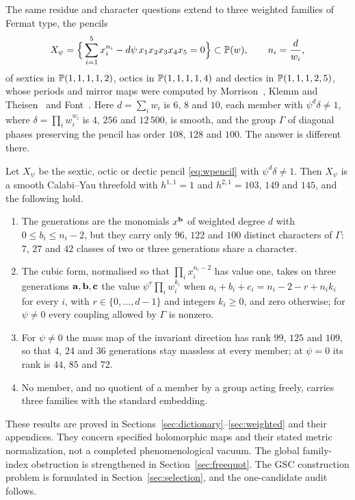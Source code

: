 The same residue and character questions extend to three weighted families
of Fermat type, the pencils
\begin{equation}\label{eq:wpencil}
X_\psi=\Big\{\sum_{i=1}^5x_i^{n_i}-d\psi\,x_1x_2x_3x_4x_5=0\Big\}
\subset\mathbb{P}(w),\qquad n_i=\frac{d}{w_i},
\end{equation}
of sextics in $\mathbb{P}(1,1,1,1,2)$, octics in $\mathbb{P}(1,1,1,1,4)$ and dectics in
$\mathbb{P}(1,1,1,2,5)$, whose periods and mirror maps were computed by
Morrison~\cite{Mor92}, Klemm and Theisen~\cite{KT93} and
Font~\cite{Fon93}. Here $d=\sum_iw_i$ is $6$, $8$ and $10$, each member
with $\psi^d\delta\ne1$, where $\delta=\prod_iw_i^{w_i}$ is $4$, $256$ and
$12\,500$, is smooth, and the group $\Gamma$ of diagonal phases preserving
the pencil has order $108$, $128$ and $100$. The answer is different there.

\begin{theorem}\label{thm:E}
Let $X_\psi$ be the sextic, octic or dectic pencil \eqref{eq:wpencil} with
$\psi^d\delta\ne1$. Then $X_\psi$ is a smooth Calabi--Yau threefold with
$h^{1,1}=1$ and $h^{2,1}=103$, $149$ and $145$, and the following hold.
\begin{enumerate}[label=\textup{(\roman*)},leftmargin=*,itemsep=1pt]
\item The generations are the monomials $x^{\mathbf{b}}$ of weighted degree $d$
with $0\le b_i\le n_i-2$, but they carry only $96$, $122$ and $100$
distinct characters of $\Gamma$: $7$, $27$ and $42$ classes of two or three
generations share a character.
\item The cubic form, normalised so that $\prod_ix_i^{n_i-2}$ has value
one, takes on three generations $\mathbf{a},\mathbf{b},\mathbf{c}$ the value
$\psi^r\prod_iw_i^{k_i}$ when $a_i+b_i+c_i=n_i-2-r+n_ik_i$ for every $i$,
with $r\in\{0,\dots,d-1\}$ and integers $k_i\ge0$, and zero otherwise; for
$\psi\ne0$ every coupling allowed by $\Gamma$ is nonzero.
\item For $\psi\ne0$ the mass map of the invariant direction has rank
$99$, $125$ and $109$, so that $4$, $24$ and $36$ generations stay massless
at every member; at $\psi=0$ its rank is $44$, $85$ and $72$.
\item No member, and no quotient of a member by a group acting freely,
carries three families with the standard embedding.
\end{enumerate}
\end{theorem}




These results are proved in Sections~\ref{sec:dictionary}--\ref{sec:weighted}
and their appendices. They concern specified holomorphic maps and
their stated metric normalization, not a completed phenomenological
vacuum. The global family-index obstruction is strengthened in
Section~\ref{sec:freequot}. The GSC construction problem is formulated
in Section~\ref{sec:selection}, and the one-candidate audit follows.


